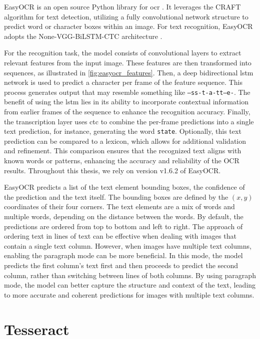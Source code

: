 EasyOCR is an open source Python library for \gls{ocr} \cite{easyocr_gitub_2020}.
It leverages the CRAFT algorithm \cite{craft_2019} for text detection, utilizing a fully convolutional network structure to predict word or character boxes within an image.
For text recognition, EasyOCR adopts the None-VGG-BiLSTM-CTC architecture \cite{crnn_2015}.

For the recognition task, the model consists of convolutional layers to extract relevant features from the input image.
These features are then transformed into sequences, as illustrated in \autoref{fig:easyocr_features}.
Then, a deep bidirectional \gls{lstm} network is used to predict a character per frame of the feature sequence.
This process generates output that may resemble something like \texttt{--ss-t-a-tt--e-}.
The benefit of using the \gls{lstm} lies in its ability to incorporate contextual information from earlier frames of the sequence to enhance the recognition accuracy.
Finally, the transcription layer uses \gls{ctc} to combine the per-frame predictions into a single text prediction, for instance, generating the word \texttt{state}.
Optionally, this text prediction can be compared to a lexicon, which allows for additional validation and refinement.
This comparison ensures that the recognized text aligns with known words or patterns, enhancing the accuracy and reliability of the OCR results.
Throughout this thesis, we rely on version v1.6.2 of EasyOCR.

EasyOCR predicts a list of the text element bounding boxes, the confidence of the prediction and the text itself.
The bounding boxes are defined by the $(x, y)$ coordinates of their four corners.
The text elements are a mix of words and multiple words, depending on the distance between the words.
By default, the predictions are ordered from top to bottom and left to right.
The approach of ordering text in lines of text can be effective when dealing with images that contain a single text column.
However, when images have multiple text columns, enabling the paragraph mode can be more beneficial.
In this mode, the model predicts the first column's text first and then proceeds to predict the second column, rather than switching between lines of both columns.
By using paragraph mode, the model can better capture the structure and context of the text, leading to more accurate and coherent predictions for images with multiple text columns.


\section{Tesseract}
\label{subsec:tesseract}

